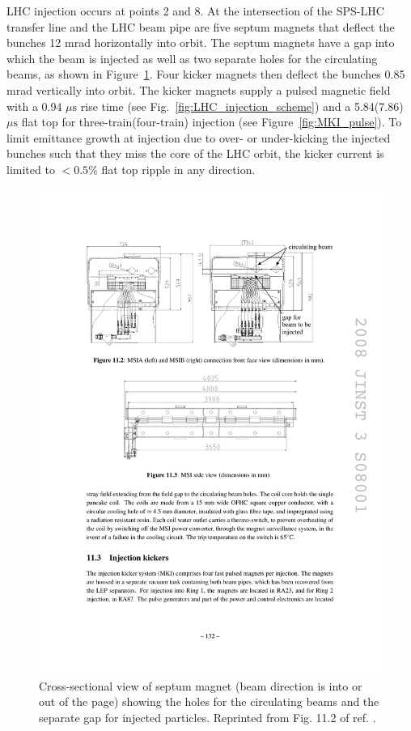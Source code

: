 \documentclass[dissertation.tex]{subfiles}
\begin{document}
LHC injection occurs at points 2 and 8.  At the intersection of the SPS-LHC transfer line and the LHC beam pipe are five septum magnets that deflect the bunches 12 mrad horizontally into orbit.  The septum magnets have a gap into which the beam is injected as well as two separate holes for the circulating beams, as shown in Figure~\ref{fig:LHC_septum_cross_section}.  Four kicker magnets then deflect the bunches 0.85 mrad vertically into orbit.  The kicker magnets supply a pulsed magnetic field with a 0.94 $\mu\mbox{s}$ rise time (see Fig.~\ref{fig:LHC_injection_scheme}) and a 5.84(7.86) $\mu\mbox{s}$ flat top for three-train(four-train) injection (see Figure~\ref{fig:MKI_pulse}).  To limit emittance growth at injection due to over- or under-kicking the injected bunches such that they miss the core of the LHC orbit, the kicker current is limited to $<0.5\%$ flat top ripple in any direction.

\begin{figure}
	\centering
	\includegraphics[scale=1.0]{LHC_septum_cross_section}
	\caption{Cross-sectional view of septum magnet (beam direction is into or out of the page) showing the holes for the circulating beams and the separate gap for injected particles.  Reprinted from Fig. 11.2 of ref. \cite{LHC_paper}.}
	\label{fig:LHC_septum_cross_section}
\end{figure}
\end{document}

